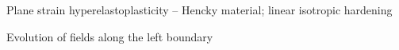 \begin{frame}{Plane strain hyperelastoplasticity -- Hencky material; linear isotropic hardening}
  \begin{block}{Evolution of fields along the left boundary}
    
  \end{block}
  \begin{columns}
    \begin{column}{0.49\textwidth}
      
    \end{column}
    \begin{column}{0.49\textwidth}
      
    \end{column}
  \end{columns}
\end{frame}
